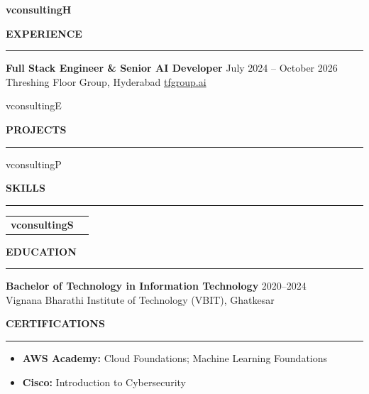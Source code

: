 \documentclass{resume}
\renewenvironment{rSection}[1]{
    \vspace{8pt}
    \noindent
    {\bfseries\MakeUppercase{#1}}
    \par
    \vspace{-3.5pt}
    \noindent\rule{\textwidth}{0.4pt}
    \par
    \vspace{4pt}
}{
    \vspace{3pt}
}
\def\Variant{consulting}
\newcommand{\Headline}{\csname v\Variant H\endcsname}
\newcommand{\ExpList}{\csname v\Variant E\endcsname}
\newcommand{\ProjList}{\csname v\Variant P\endcsname}
\newcommand{\SkillOrder}{\csname v\Variant S\endcsname}
\begin{document}
\sloppy

\begin{center}\large\textbf{\Headline}\end{center}

\begin{rSection}{Experience}
\textbf{Full Stack Engineer \& Senior AI Developer} \hfill July 2024 -- October 2026 \\
Threshing Floor Group, Hyderabad \hfill \href{https://tfgroup.ai/en}{tfgroup.ai}
\begin{itemize}
\ExpList
\end{itemize}
\end{rSection}

\begin{rSection}{Projects}
\begin{itemize}
\ProjList
\end{itemize}
\end{rSection}

\begin{rSection}{Skills}
\begin{tabularx}{\textwidth}{@{}>{\bfseries}p{1.6in}X@{}}
\SkillOrder
\end{tabularx}
\end{rSection}

\begin{rSection}{Education}
\textbf{Bachelor of Technology in Information Technology} \hfill 2020--2024 \\
Vignana Bharathi Institute of Technology (VBIT), Ghatkesar
\end{rSection}

\begin{rSection}{Certifications}
\begin{itemize}
\item \textbf{AWS Academy:} Cloud Foundations; Machine Learning Foundations
\item \textbf{Cisco:} Introduction to Cybersecurity
\end{itemize}
\end{rSection}
\end{document}
